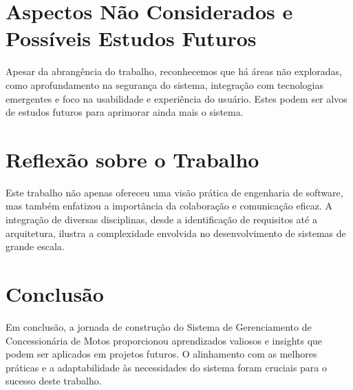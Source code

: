 \section{Aspectos Não Considerados e Possíveis Estudos Futuros}

Apesar da abrangência do trabalho, reconhecemos que há áreas não exploradas, como aprofundamento na segurança do sistema, integração com tecnologias emergentes e foco na usabilidade e experiência do usuário. Estes podem ser alvos de estudos futuros para aprimorar ainda mais o sistema.

\section{Reflexão sobre o Trabalho}

Este trabalho não apenas ofereceu uma visão prática de engenharia de software, mas também enfatizou a importância da colaboração e comunicação eficaz. A integração de diversas disciplinas, desde a identificação de requisitos até a arquitetura, ilustra a complexidade envolvida no desenvolvimento de sistemas de grande escala.

\section{Conclusão}

Em conclusão, a jornada de construção do Sistema de Gerenciamento de Concessionária de Motos proporcionou aprendizados valiosos e insights que podem ser aplicados em projetos futuros. O alinhamento com as melhores práticas e a adaptabilidade às necessidades do sistema foram cruciais para o sucesso deste trabalho.
